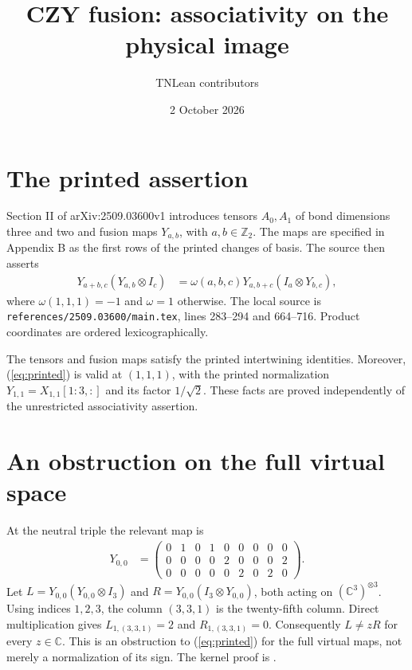 \documentclass[11pt]{article}
\title{CZY fusion: associativity on the physical image}
\author{TNLean contributors}
\date{2 October 2026}
\begin{document}
\maketitle
{}

\section{The printed assertion}

Section II of arXiv:2509.03600v1 introduces tensors $A_0,A_1$ of bond
 dimensions three and two and fusion maps $Y_{a,b}$, with $a,b\in\mathbb Z_2$.
The maps are specified in Appendix B as the first rows of the printed
changes of basis. The source then asserts
\begin{align}
 Y_{a+b,c}(Y_{a,b}\otimes I_c)
 &=\omega(a,b,c)Y_{a,b+c}(I_a\otimes Y_{b,c}),
 \label{eq:printed}
\end{align}
where $\omega(1,1,1)=-1$ and $\omega=1$ otherwise.
The local source is \nolinkurl{references/2509.03600/main.tex},
lines 283--294 and 664--716. Product coordinates are ordered lexicographically.

The tensors and fusion maps satisfy the printed intertwining identities.
Moreover, (\ref{eq:printed}) is valid at $(1,1,1)$, with the printed
normalization $Y_{1,1}=X_{1,1}[1{:}3,:]$ and its factor $1/\sqrt2$.
These facts are proved independently of the unrestricted associativity assertion.

\section{An obstruction on the full virtual space}

At the neutral triple the relevant map is
\begin{align}
 Y_{0,0}&=\begin{pmatrix}
 0&1&0&1&0&0&0&0&0\\
 0&0&0&0&2&0&0&0&2\\
 0&0&0&0&0&2&0&2&0
 \end{pmatrix}.
 \label{eq:neutral}
\end{align}
Let $L=Y_{0,0}(Y_{0,0}\otimes I_3)$ and
$R=Y_{0,0}(I_3\otimes Y_{0,0})$, both acting on $(\mathbb C^3)^{\otimes3}$.
Using indices $1,2,3$, the column $(3,3,1)$ is the twenty-fifth column.
Direct multiplication gives $L_{1,(3,3,1)}=2$ and $R_{1,(3,3,1)}=0$.
Consequently $L\ne zR$ for every $z\in\mathbb C$.
This is an obstruction to (\ref{eq:printed}) for the full virtual maps,
not merely a normalization of its sign.
The kernel proof is .
\end{document}
